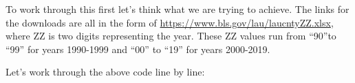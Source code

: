 \documentclass[
]{book}
\newenvironment{Shaded}{\begin{snugshade}}{\end{snugshade}}
\newcommand{\AttributeTok}[1]{\textcolor[rgb]{0.77,0.63,0.00}{#1}}
\newcommand{\CommentTok}[1]{\textcolor[rgb]{0.56,0.35,0.01}{\textit{#1}}}
\newcommand{\FunctionTok}[1]{\textcolor[rgb]{0.00,0.00,0.00}{#1}}
\newcommand{\NormalTok}[1]{#1}
\newcommand{\OtherTok}[1]{\textcolor[rgb]{0.56,0.35,0.01}{#1}}
\newcommand{\SpecialCharTok}[1]{\textcolor[rgb]{0.00,0.00,0.00}{#1}}
\newcommand{\StringTok}[1]{\textcolor[rgb]{0.31,0.60,0.02}{#1}}
\begin{document}
\begin{Shaded}
\end{Shaded}

To work through this first let's think what we are trying to achieve. The links for the downloads are all in the form of \href{https://www.bls.gov/lau/home.htm}{https://www.bls.gov/lau/laucntyZZ.xlsx}, where ZZ is two digits representing the year. These ZZ values run from ``90''to ``99'' for years 1990-1999 and ``00'' to ``19'' for years 2000-2019.

Let's work through the above code line by line:
\end{document}
